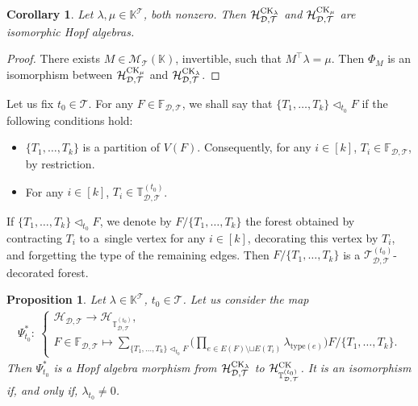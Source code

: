 \documentclass[pdftex]{sigma}
\numberwithin{equation}{section}
\newtheorem{Corollary}[Theorem]{Corollary}
\newtheorem{Proposition}[Theorem]{Proposition}
 { \theoremstyle{definition}
\newtheorem{Definition}[Theorem]{Definition}
\newtheorem{Note}[Theorem]{Note}
\newtheorem{Example}[Theorem]{Example}
\newtheorem{Remark}[Theorem]{Remark}
\newtheorem{Notation}[Theorem]{Notation}}
\newcommand{\K}{\mathbb{K}}
\newcommand{\T}{\mathcal{T}}
\newcommand{\D}{\mathcal{D}}
\newcommand{\h}{\mathcal{H}}
\newcommand{\bfT}{\mathbb{T}}
\newcommand{\bfF}{\mathbb{F}}
\newcommand{\M}{\mathcal{M}}
\newcommand{\type}{\mathrm{type}}
\begin{document}
\begin{Corollary} \label{cor24}
Let $\lambda,\mu \in \K^\T$, both nonzero. Then $\h_{\D,\T}^{{\rm CK}_\lambda}$ and $\h_{\D,\T}^{{\rm CK}_\mu}$
 are isomorphic Hopf algebras.
\end{Corollary}

\begin{proof} There exists $M\in \M_\T(\K)$, invertible, such that $M^\top \lambda=\mu$.
Then $\Phi_M$ is an isomorphism between $\h_{\D,\T}^{{\rm CK}_\mu}$ and $\h_{\D,\T}^{{\rm CK}_\lambda}$. \end{proof}

\begin{Definition}
Let us fix $t_0\in \T$. For any $F \in \bfF_{\D,\T}$, we shall say that $\{T_1,\dots,T_k\}\triangleleft_{t_0} F$
if the following conditions hold:
\begin{itemize}\itemsep=0pt
\item $\{T_1,\dots,T_k\}$ is a partition of $V(F)$. Consequently, for any $i\in [k]$, $T_i\in \bfF_{\D,\T}$,
by restriction.
\item For any $i\in [k]$, $T_i\in \bfT_{\D,\T}^{(t_0)}$.
\end{itemize}
If $\{T_1,\dots,T_k\}\triangleleft_{t_0} F$, we denote by $F/\{T_1,\dots,T_k\}$
the forest obtained by contracting $T_i$ to a~single vertex
for any $i\in [k]$, decorating this vertex by $T_i$, and forgetting the type of the remaining edges.
Then $F/\{T_1,\dots,T_k\}$
is a $\T_{\D,\T}^{(t_0)}$-decorated forest.
\end{Definition}

\begin{Proposition} \label{prop26}
Let $\lambda\in \K^\T$, $t_0\in \T$. Let us consider the map
\begin{gather*}
\Psi_{t_0}^*\colon\ \begin{cases}
\h_{\D,\T} \longrightarrow \h_{\bfT_{\D,\T}^{(t_0)}},
\\
F\in \bfF_{\D,\T} \longmapsto \displaystyle \sum_{\{T_1,\dots,T_k\}\triangleleft_{t_0} F}
\bigg(\prod_{e\in E(F)\setminus \sqcup E(T_i)}\lambda_{\type(e)}\bigg) F/\{T_1,\dots,T_k\}.
\end{cases}
\end{gather*}
Then $\Psi_{t_0}^*$ is a Hopf algebra morphism from $\h_{\D,\T}^{{\rm CK}_\lambda}$ to $\h_{\bfT_{\D,\T}^{(t_0)}}^{{\rm CK}}$.
It is an isomorphism if, and only if, $\lambda_{t_0}\neq 0$.
\end{Proposition}
\end{document}

